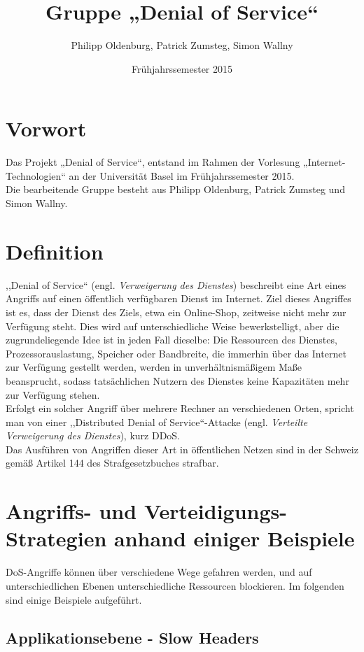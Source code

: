 \documentclass[12pt,a4paper]{article}
\author{Philipp Oldenburg, Patrick Zumsteg, Simon Wallny}
\title{Gruppe „Denial of Service“}
\date{Frühjahrssemester 2015}
\begin{document}
\maketitle
\tableofcontents
\section{Vorwort}
Das Projekt „Denial of Service“, entstand im Rahmen der Vorlesung „Internet-Technologien“ an der Universität Basel im Frühjahrssemester 2015.\hfill\\
Die bearbeitende Gruppe besteht aus Philipp Oldenburg, Patrick Zumsteg und Simon Wallny.
\newpage
\section{Definition}
,,Denial of Service`` (engl. \textit{Verweigerung des Dienstes}) beschreibt eine Art eines Angriffs auf einen öffentlich verfügbaren Dienst im Internet. Ziel dieses Angriffes ist es, dass der Dienst des Ziels, etwa ein Online-Shop, zeitweise nicht mehr zur Verfügung steht.  Dies wird auf unterschiedliche Weise bewerkstelligt, aber die zugrundeliegende Idee ist in jeden Fall dieselbe: Die Ressourcen des Dienstes, Prozessorauslastung, Speicher oder Bandbreite, die immerhin über das Internet zur Verfügung gestellt werden, werden in unverhältnismäßigem Maße beansprucht, sodass tatsächlichen Nutzern des Dienstes keine Kapazitäten mehr zur Verfügung stehen.\\
Erfolgt ein solcher Angriff über mehrere Rechner an verschiedenen Orten, spricht man von einer ,,Distributed Denial of Service``-Attacke (engl. \textit{Verteilte Verweigerung des Dienstes}), kurz DDoS.\\
Das Ausführen von Angriffen dieser Art in öffentlichen Netzen sind in der Schweiz gemäß Artikel 144 des Strafgesetzbuches strafbar.
\section{Angriffs- und Verteidigungs-Strategien anhand einiger Beispiele}
DoS-Angriffe können über verschiedene Wege gefahren werden, und auf unterschiedlichen Ebenen unterschiedliche Ressourcen blockieren. Im folgenden sind einige Beispiele aufgeführt.
\subsection{Applikationsebene - Slow Headers}
\end{document}
